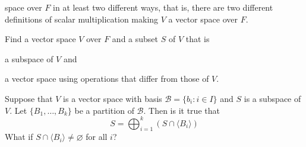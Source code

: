 \begin{exercise}
\begin{exercise}[label = (\alph*)]
    space over \(F\) in at least two different ways, that is, there are two
    different definitions of scalar multiplication making \(V\) a vector space
    over \(F\).
  \item
    Find a vector space \(V\) over \(F\) and a subset \(S\) of \(V\) that is
    \begin{enumerate*}[label = (\arabic*)]
    \item
      a subspace of \(V\) and
    \item
      a vector space using operations that differ from those of \(V\).
    \end{enumerate*}
  \end{exercise}
\item
  Suppose that \(V\) is a vector space with basis
  \(\mathcal{B} = \{b_i\colon i\in I\}\) and \(S\) is a subspace of \(V\).
  Let \(\{B_1,\ldots,B_k\}\) be a partition of \(\mathcal{B}\).
  Then is it true that
  \[
  S = \bigoplus_{i = 1}^k(S\cap\langle B_i\rangle)
  \]
  What if \(S\cap\langle B_i\rangle\neq\varnothing\) for all \(i\)?
\end{exercise}

